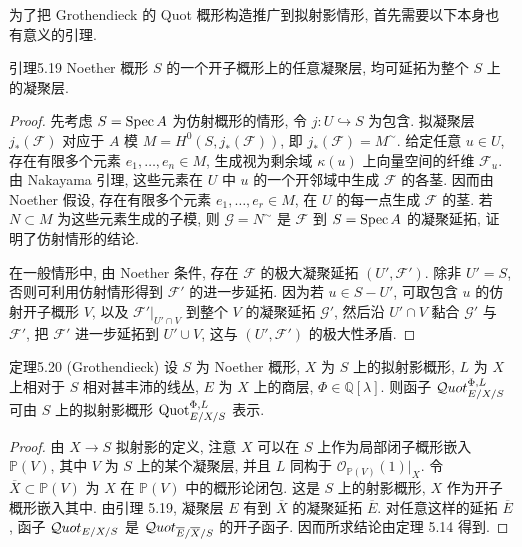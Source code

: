 为了把 Grothendieck 的 Quot 概形构造推广到拟射影情形, 首先需要以下本身也有意义的引理.
\begin{origstatement}{引理}{5.19}\label{ch05:lem5.19}
Noether 概形 $S$ 的一个开子概形上的任意凝聚层, 均可延拓为整个 $S$ 上的凝聚层.
\end{origstatement}
\begin{proof}
先考虑 $S=\operatorname{Spec} A$ 为仿射概形的情形, 令 $j:U\hookrightarrow S$ 为包含. 拟凝聚层 $j_*(\mathcal F)$ 对应于 $A$ 模 $M=H^0(S,j_*(\mathcal F))$, 即 $j_*(\mathcal F)=M^\sim$. 给定任意 $u\in U$, 存在有限多个元素 $e_1,\ldots,e_n\in M$, 生成视为剩余域 $\kappa(u)$ 上向量空间的纤维 $\mathcal F_u$. 由 Nakayama 引理, 这些元素在 $U$ 中 $u$ 的一个开邻域中生成 $\mathcal F$ 的各茎. 因而由 Noether 假设, 存在有限多个元素 $e_1,\ldots,e_r\in M$, 在 $U$ 的每一点生成 $\mathcal F$ 的茎. 若 $N\subset M$ 为这些元素生成的子模, 则 $\mathcal G=N^\sim$ 是 $\mathcal F$ 到 $S=\operatorname{Spec} A$ 的凝聚延拓, 证明了仿射情形的结论.

在一般情形中, 由 Noether 条件, 存在 $\mathcal F$ 的极大凝聚延拓 $(U',\mathcal F')$. 除非 $U'=S$, 否则可利用仿射情形得到 $\mathcal F'$ 的进一步延拓. 因为若 $u\in S-U'$, 可取包含 $u$ 的仿射开子概形 $V$, 以及 $\mathcal F'|_{U'\cap V}$ 到整个 $V$ 的凝聚延拓 $\mathcal G'$, 然后沿 $U'\cap V$ 黏合 $\mathcal G'$ 与 $\mathcal F'$, 把 $\mathcal F'$ 进一步延拓到 $U'\cup V$, 这与 $(U',\mathcal F')$ 的极大性矛盾.
\end{proof}

\begin{origstatement}{定理}{5.20}\label{ch05:thm5.20}
(Grothendieck) 设 $S$ 为 Noether 概形, $X$ 为 $S$ 上的拟射影概形, $L$ 为 $X$ 上相对于 $S$ 相对甚丰沛的线丛, $E$ 为 $X$ 上的商层, $\Phi\in\mathbb Q[\lambda]$. 则函子 $\mathcal{Q}uot^{\Phi,L}_{E/X/S}$ 可由 $S$ 上的拟射影概形 $\operatorname{Quot}^{\Phi,L}_{E/X/S}$ 表示.
\end{origstatement}
\begin{proof}
由 $X\to S$ 拟射影的定义, 注意 $X$ 可以在 $S$ 上作为局部闭子概形嵌入 $\mathbb P(V)$, 其中 $V$ 为 $S$ 上的某个凝聚层, 并且 $L$ 同构于 $\mathcal O_{\mathbb P(V)}(1)|_X$. 令 $\overline X\subset\mathbb P(V)$ 为 $X$ 在 $\mathbb P(V)$ 中的概形论闭包. 这是 $S$ 上的射影概形, $X$ 作为开子概形嵌入其中. 由引理 5.19, 凝聚层 $E$ 有到 $\overline X$ 的凝聚延拓 $\overline E$. 对任意这样的延拓 $\overline E$, 函子 $\mathcal{Q}uot_{E/X/S}$ 是 $\mathcal{Q}uot_{\overline E/\overline X/S}$ 的开子函子. 因而所求结论由定理 5.14 得到.
\end{proof}

